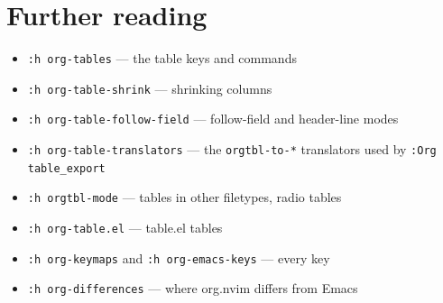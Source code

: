 \section{Further reading}
\label{sec:org2bf539b}
\begin{itemize}
\item \texttt{:h org-tables} — the table keys and commands
\item \texttt{:h org-table-shrink} — shrinking columns
\item \texttt{:h org-table-follow-field} — follow-field and header-line modes
\item \texttt{:h org-table-translators} — the \texttt{orgtbl-to-*} translators used by
\texttt{:Org table\_export}
\item \texttt{:h orgtbl-mode} — tables in other filetypes, radio tables
\item \texttt{:h org-table.el} — table.el tables
\item \texttt{:h org-keymaps} and \texttt{:h org-emacs-keys} — every key
\item \texttt{:h org-differences} — where org.nvim differs from Emacs
\end{itemize}
